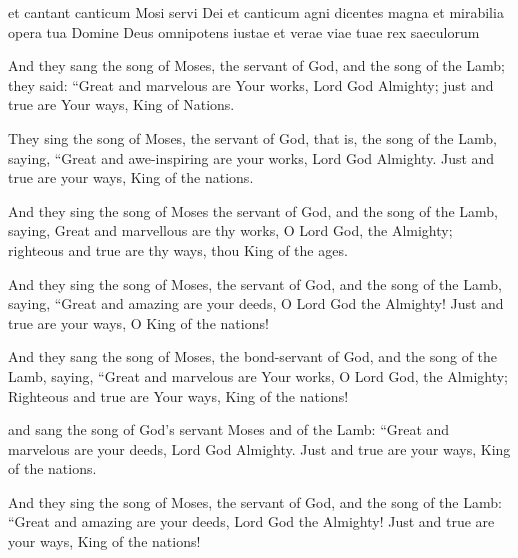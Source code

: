 			\begin{framed}
			\scriptsize
				\begin{compactdesc}
					\item[SBLG] 
					\item[BSV] et cantant canticum Mosi servi Dei
									et canticum agni dicentes
									magna et mirabilia opera tua Domine Deus omnipotens
									iustae et verae viae tuae rex saeculorum
					\item[AB-1975 252] And they sang the song of Moses, the servant of God, and the song of the Lamb; they said:
						``Great and marvelous are Your works,
						Lord God Almighty;
						just and true are Your ways,
						King of Nations.
					\item[AB-2014 631] They sing the song of Moses, the servant of God, that is, the song of the Lamb,\footnotemark{}
					saying,
						``Great and awe-inspiring are your works, Lord God Almighty.
						Just and true are your ways, King of the nations.
					\item[ASV] And they sing the song of Moses the servant of God, and the song of the Lamb, saying, Great and marvellous are thy works, O Lord God, the Almighty; righteous and true are thy ways, thou King of the ages.
					\item[ESV] And they sing the song of Moses, the servant of God, and the song of the Lamb, saying, ``Great and amazing are your deeds, O Lord God the Almighty! Just and true are your ways, O King of the nations!
					\item[NASB] And they sang the song of Moses, the bond-servant of God, and the song of the Lamb, saying, ``Great and marvelous are Your works, O Lord God, the Almighty; Righteous and true are Your ways, King of the nations!
					\item[NIV] and sang the song of God's servant Moses and of the Lamb: ``Great and marvelous are your deeds, Lord God Almighty. Just and true are your ways, King of the nations.
					\item[NRSV] And they sing the song of Moses, the servant of God, and the song of the Lamb: ``Great and amazing are your deeds, Lord God the Almighty! Just and true are your ways, King of the nations!
				\end{compactdesc}
			\end{framed}
